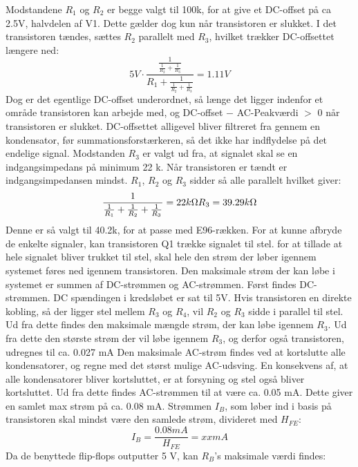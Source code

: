Modstandene $R_1$ og $R_2$ er begge valgt til 100k\ohm, for at give et DC-offset på ca 2.5V, halvdelen af V1. Dette gælder dog kun når transistoren er slukket. I det transistoren tændes, sættes $R_2$ parallelt med $R_3$, hvilket trækker DC-offsettet længere ned:
\begin{equation}
5V\cdot \frac{\frac{1}{\frac{1}{R_2}+\frac{1}{R_3}}}{R_1+\frac{1}{\frac{1}{R_2}+\frac{1}{R_3}}}=1.11 V
\end{equation}
Dog er det egentlige DC-offset underordnet, så længe det ligger indenfor et område transistoren kan arbejde med, og DC-offset $-$ AC-Peakværdi $>$ 0 når transistoren er slukket. DC-offsettet alligevel bliver filtreret fra gennem en kondensator, før summationsforstærkeren, så det ikke har indflydelse på det endelige signal.
Modstanden $R_3$ er valgt ud fra, at signalet skal se en indgangsimpedans på minimum 22 k\ohm. Når transistoren er tændt er indgangsimpedansen mindst. $R_1$, $R_2$ og $R_3$ sidder så alle parallelt hvilket giver:
\begin{equation}
\frac{1}{\frac{1}{R_1}+\frac{1}{R_2}+\frac{1}{R_3}}=22 k\ohm
\\
R_3=39.29 k\ohm
\end{equation}
Denne er så valgt til 40.2k\ohm, for at passe med E96-rækken.
For at kunne afbryde de enkelte signaler, kan transistoren Q1 trække signalet til stel. for at tillade at hele signalet bliver trukket til stel, skal hele den strøm der løber igennem systemet føres ned igennem transistoren. Den maksimale strøm der kan løbe i systemet er summen af DC-strømmen og AC-strømmen. 
Først findes DC-strømmen. DC spændingen i kredsløbet er sat til 5V. Hvis transistoren en direkte kobling, så der ligger stel mellem $R_3$ og $R_4$, vil $R_2$ og $R_3$ sidde i parallel til stel. Ud fra dette findes den maksimale mængde strøm, der kan løbe igennem $R_3$. Ud fra dette den største strøm der vil løbe igennem $R_3$, og derfor også transistoren, udregnes til ca. 0.027 mA
Den maksimale AC-strøm findes ved at kortslutte alle kondensatorer, og regne med det størst mulige AC-udsving. En konsekvens af, at alle kondensatorer bliver kortsluttet, er at forsyning og stel også bliver kortsluttet. Ud fra dette findes AC-strømmen til at være ca. 0.05 mA. Dette giver en samlet max strøm på ca. 0.08 mA.
Strømmen $I_B$, som løber ind i basis på transistoren skal mindst være den samlede strøm, divideret med $H_{FE}$:
\begin{equation}
I_B = \frac{0.08 mA}{H_{FE}} = xx mA
\end{equation}
Da de benyttede flip-flops outputter 5 V, kan $R_B$'s maksimale værdi findes:
